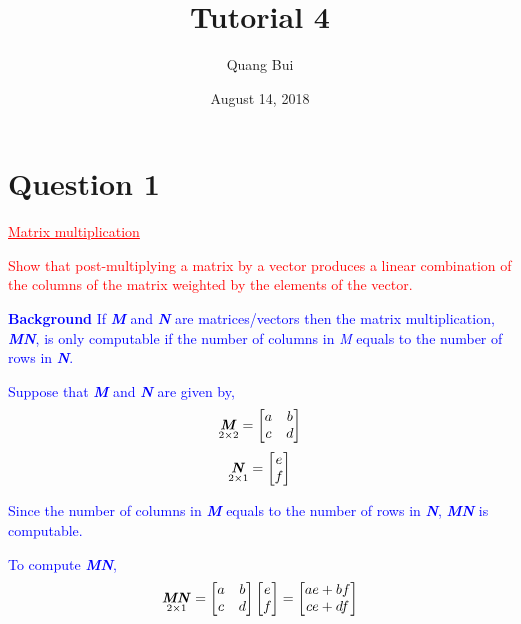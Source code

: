 \documentclass[12pt]{report}
\title{Tutorial 4}
\author{Quang Bui}
\subtitle
{
	\textbf{keywords}: matrix, matrices, vector, column space, histogram, scatter plot, mean, standard deviation, regression, simple, conditional expectation, OLS estimator, prediction, R squared, residual, interpretation, intercept, slope 
	
	\textbf{estimated reading time}: 35 minutes
}
\date{August 14, 2018}
\newenvironment{blueframed}[1][blue]
{\def\FrameCommand{\fboxsep=\FrameSep\fcolorbox{#1}{white}}%
\MakeFramed {\advance\hsize-\width \FrameRestore}}
{\endMakeFramed}
\begin{document}
	
\maketitle

\section*{Question 1}
\textcolor{red}{\underline{Matrix multiplication}}

\noindent \textcolor{red}{Show that post-multiplying a matrix by a vector produces a linear combination of the columns of the matrix weighted by the elements of the vector.}

\justify
\begin{blueframed}
\textcolor{blue}{\textbf{Background}}
\vspace{-\baselineskip}
\justify
\textcolor{blue}{If \textbf{\textit{M}} and \textbf{\textit{N}} are matrices/vectors then the matrix multiplication, \textbf{\textit{MN}}, is only computable if the number of columns in \textit{M} equals to the number of rows in \textbf{\textit{N}}.}

\noindent \textcolor{blue}{Suppose that \textbf{\textit{M}} and \textbf{\textit{N}} are given by,}
\textcolor{blue}
	{$$\underset{2\times2}{\textbf{\textit{M}}}
		=
		\begin{bmatrix}
			a & b \\
			c & d 
		\end{bmatrix}
	$$}
\textcolor{blue}
	{$$\underset{2\times1}{\textbf{\textit{N}}}
		=
		\begin{bmatrix}
			e \\
			f  
	\end{bmatrix}
	$$}

\noindent \textcolor{blue}{Since the number of columns in \textbf{\textit{M}} equals to the number of rows in \textbf{\textit{N}}, \textbf{\textit{MN}} is computable.}

\noindent \textcolor{blue}{To compute \textbf{\textit{MN}},}
\textcolor{blue}
{$$\underset{2\times1}{\textbf{\textit{MN}}}
	=
	\begin{bmatrix}
	a & b \\
	c & d 
	\end{bmatrix}
	\begin{bmatrix}
	e \\
	f 
	\end{bmatrix}
	=
	\begin{bmatrix}
	ae+bf \\
	ce+df
	\end{bmatrix}
$$}
\end{blueframed}
\end{document}

